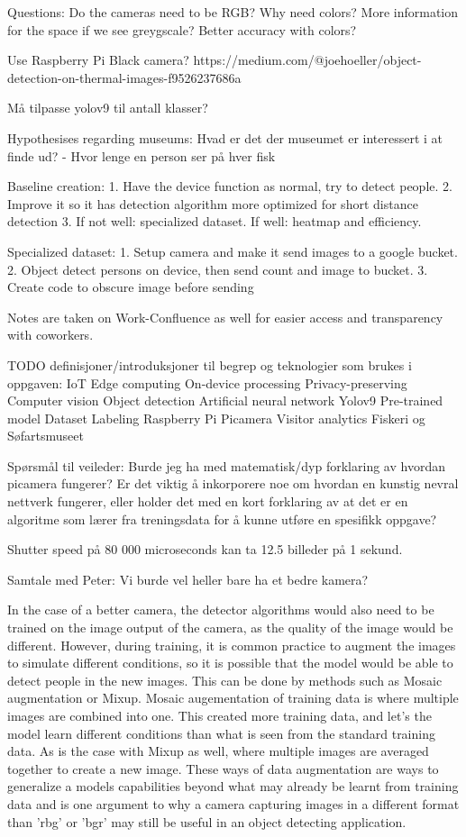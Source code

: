 Questions:
Do the cameras need to be RGB? Why need colors? More information for the space if we see greygscale? Better accuracy with colors?

Use Raspberry Pi Black camera?
https://medium.com/@joehoeller/object-detection-on-thermal-images-f9526237686a

Må tilpasse yolov9 til antall klasser?


Hypothesises regarding museums:
Hvad er det der museumet er interessert i at finde ud?
    - Hvor lenge en person ser på hver fisk




Baseline creation:
1. Have the device function as normal, try to detect people. 
2. Improve it so it has detection algorithm more optimized for short distance detection
3. If not well: specialized dataset. If well: heatmap and efficiency.

Specialized dataset:
1. Setup camera and make it send images to a google bucket. 
2. Object detect persons on device, then send count and image to bucket.
3. Create code to obscure image before sending


Notes are taken on Work-Confluence as well for easier access and transparency with coworkers. 



TODO definisjoner/introduksjoner til begrep og teknologier som brukes i oppgaven:
IoT
Edge computing
    On-device processing
    Privacy-preserving
Computer vision
Object detection
    Artificial neural network
    Yolov9
    Pre-trained model
    Dataset
    Labeling
Raspberry Pi
    Picamera
Visitor analytics
    Fiskeri og Søfartsmuseet

Spørsmål til veileder:
Burde jeg ha med matematisk/dyp forklaring av hvordan picamera fungerer?
Er det viktig å inkorporere noe om hvordan en kunstig nevral nettverk fungerer, eller holder det med en kort forklaring av at det er en algoritme som lærer fra treningsdata for å kunne utføre en spesifikk oppgave?

Shutter speed på 80 000 microseconds kan ta 12.5 billeder på 1 sekund. 


Samtale med Peter:
Vi burde vel heller bare ha et bedre kamera?

In the case of a better camera, the detector algorithms would also need to be trained on the image output of the camera, as the quality of the image would be different. However, during training, it is common practice to augment the images to simulate different conditions, so it is possible that the model would be able to detect people in the new images. This can be done by methods such as Mosaic augmentation or Mixup. Mosaic augementation of training data is where multiple images are combined into one. This created more training data, and let's the model learn different conditions than what is seen from the standard training data. As is the case with Mixup as well, where multiple images are averaged together to create a new image. These ways of data augmentation are ways to generalize a models capabilities beyond what may already be learnt from training data and is one argument to why a camera capturing images in a different format than 'rbg' or 'bgr' may still be useful in an object detecting application.

